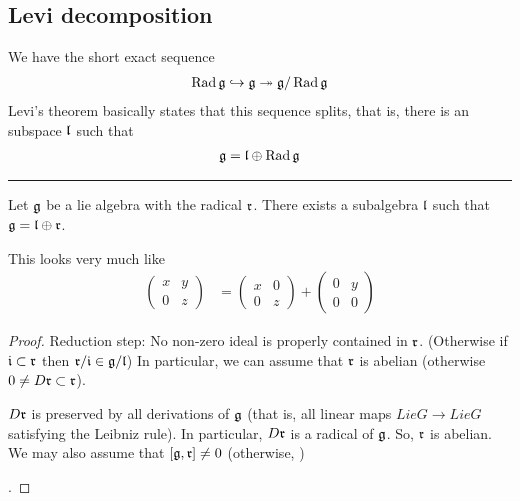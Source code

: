 \subsection{Levi decomposition}
\label{sub:levi_decomposition}

We have the short exact sequence
\begin{align}
    \operatorname{Rad} \mathfrak{g} \hookrightarrow \mathfrak{g} \twoheadrightarrow \mathfrak{g}/\operatorname{Rad}\mathfrak{g}
\end{align}
Levi's theorem basically states that this sequence splits, that is, there is an subspace $\Lie{l}$ such that
\begin{align}
    \LieG = \Lie{l}\oplus\Rad\LieG
\end{align}

\hrule\vspace{1em}

\begin{theorem}
   Let $\mathfrak{g}$  be a lie algebra with the radical $\Lie r$. There exists a subalgebra $\Lie l$ such that $\Lie g = \Lie l \oplus \Lie r$.
\end{theorem}
\begin{insight}
    This looks very much like 
    \begin{align}
        \begin{pmatrix}  x& y \\ 0 & z \end{pmatrix} &= \begin{pmatrix} x & 0 \\ 0 & z \end{pmatrix} + \begin{pmatrix} 0 & y \\ 0 & 0  \end{pmatrix}
    \end{align} 
\end{insight}
\begin{proof}
    Reduction step: No non-zero ideal is properly contained in $\Lie r$. (Otherwise if $\Lie i\subset \Lie r$ then $\Lie r/\Lie i \in \Lie g/ \Lie l$) 
     In particular, we can assume that $\Lie r $ is abelian (otherwise $0\neq D\Lie r\subset \Lie r$).

     $D\Lie r$ is preserved by all derivations of $\mathfrak{g}$ (that is, all linear maps $LieG\to LieG$ satisfying the Leibniz rule). In particular, $D\Lie r$ is a radical of $\mathfrak{g}$.
     So, $\Lie r$ is abelian. We may also assume that $[\Lie g, \Lie r]\neq 0$ (otherwise, )
    
    .

    
\end{proof}

